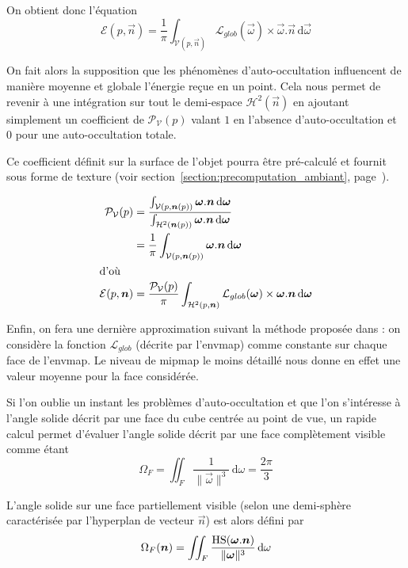 \documentclass[10pt,a4paper,twoside, twocolumn]{report}
\begin{document}
On obtient donc l’équation
\begin{equation}
	\mathcal E(p, \vec n)=\frac{1}{\pi}\int_{\mathcal V(p, \vec n )}\mathcal L_{glob}(\vec\omega)\times\vec\omega.\vec n\, \mathrm d\vec\omega
\end{equation}

On fait alors la supposition que les phénomènes d’auto-occultation influencent de manière moyenne et globale l’énergie reçue en un point. Cela nous permet de revenir à une intégration sur tout le demi-espace $\mathcal H^2(\vec{n})$ en ajoutant simplement un coefficient de $\mathcal P_{\mathcal V}(p)$ valant $1$ en l’absence d’auto-occultation et $0$ pour une auto-occultation totale.

Ce coefficient définit sur la surface de l’objet pourra être pré-calculé et fournit sous forme de texture (voir section~\ref{section:precomputation_ambiant}, page~\pageref{section:precomputation_ambiant}).

\begin{align}
	\mathcal P_{\mathcal V}(p)	&= \frac{\int_{\mathcal V(p, \vec n(p))}\vec\omega.\vec n\, \mathrm d\vec\omega}{\int_{\mathcal H^2(\vec n(p))}\vec\omega.\vec n\, \mathrm d\vec\omega}	\notag\\
															&= \frac{1}{\pi}\int_{\mathcal V(p, \vec n(p))}\vec\omega.\vec n\, \mathrm d\vec\omega \\
\intertext{d’où}
	\mathcal E(p, \vec n)				&= \frac{\mathcal P_{\mathcal V}(p)}{\pi}\int_{\mathcal H^2(p, \vec n )}\mathcal L_{glob}(\vec\omega)\times\vec\omega.\vec n\, \mathrm d\vec\omega
\end{align}

Enfin, on fera une dernière approximation suivant la méthode proposée dans \cite{Mcguire} : on considère la fonction $\mathcal L_{glob}$ (décrite par l’envmap) comme constante sur chaque face de l’envmap. Le niveau de mipmap le moins détaillé nous donne en effet une valeur moyenne pour la face considérée.

Si l’on oublie un instant les problèmes d’auto-occultation et que l’on s’intéresse à l’angle solide décrit par une face du cube centrée au point de vue, un rapide calcul permet d’évaluer l’angle solide décrit par une face complètement visible comme étant 
\begin{equation}
	\Omega_F = \iint_{F}\frac{1}{\|\vec\omega\|^3}\, \mathrm d\omega = \frac{2\pi}{3}
\end{equation}

L’angle solide sur une face partiellement visible (selon une demi-sphère caractérisée par l’hyperplan de vecteur $\vec n$) est alors défini par
\begin{equation}
	\Omega_F(\vec n) = \iint_{F}\frac{\Hs(\vec\omega.\vec n)}{\|\vec\omega\|^3}\, \mathrm d\omega
\end{equation}
\end{document}
